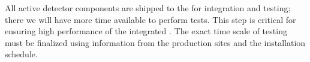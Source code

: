 \begin{comment}
The \dword{qc} of integration and installation has two main testing campaigns: one at the Integration Facility (\dword{itf}) \fixme{from Nora: This has been defined once already and need not be defined again.} and one once the \dwords{apa} are installed into the cryostat. The installation and integration team in the \dword{apa} consortium are still developing some details. 

To keep track of all components for all \dwords{apa} at the different stages of  integration and installation requires a dedicated database for \dword{qc}. For efficient integration, a simple and practical way of tagging critical parts in the \dword{apa} is also being developed.

The \dword{qa} for integration and installation relies heavily on the \dword{pdsp} experience, and at this point, no dedicated \dword{qa} protocol is developed. The full development of the protocol is being handled by the installation and integration team in the \dword{apa} consortium. 

\subsubsection{Quality Control at the Integration Facility}
\label{sec:fdsp-apa-install-qc_if}
\end{comment}

All active detector components are shipped to the  for integration and testing; there we will have more time available %
to perform tests. This step is critical for ensuring high performance of the integrated . The exact time scale of  testing must be finalized using information from the production sites and the installation schedule. 



